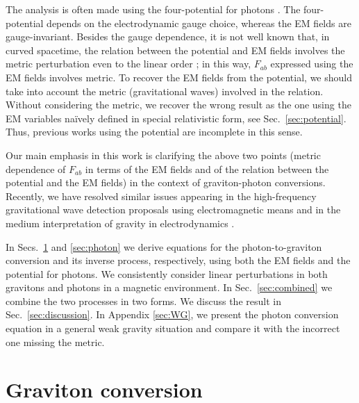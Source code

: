 \documentclass[twocolumn,amsmath,amssymb]{revtex4}
\begin{document}
The analysis is often made using the four-potential for photons \cite{Raffelt-1988}. The four-potential depends on the electrodynamic gauge choice, whereas the EM fields are gauge-invariant. Besides the gauge dependence, it is not well known that, in curved spacetime, the relation between the potential and EM fields involves the metric perturbation even to the linear order \cite{Hwang-Noh-2023-EM-NL}; in this way, $F_{ab}$ expressed using the EM fields involves metric. To recover the EM fields from the potential, we should take into account the metric (gravitational waves) involved in the relation. Without considering the metric, we recover the wrong result as the one using the EM variables na\"ively defined in special relativistic form, see Sec.\ \ref{sec:potential}. Thus, previous works using the potential are incomplete in this sense.

Our main emphasis in this work is clarifying the above two points (metric dependence of $F_{ab}$ in terms of the EM fields and of the relation between the potential and the EM fields) in the context of graviton-photon conversions. Recently, we have resolved similar issues appearing in the high-frequency gravitational wave detection proposals using electromagnetic means \cite{EM-definition} and in the medium interpretation of gravity in electrodynamics \cite{Hwang-Noh-2023-EM-NL}.

In Secs.\ \ref{sec:graviton} and \ref{sec:photon} we derive equations for the photon-to-graviton conversion and its inverse process, respectively, using both the EM fields and the potential for photons. We consistently consider linear perturbations in both gravitons and photons in a magnetic environment. In Sec.\ \ref{sec:combined} we combine the two processes in two forms. We discuss the result in Sec.\ \ref{sec:discussion}. In Appendix \ref{sec:WG}, we present the photon conversion equation in a general weak gravity situation and compare it with the incorrect one missing the metric.


%
%
%
\section{Graviton conversion}
                                        \label{sec:graviton}
\end{document}
